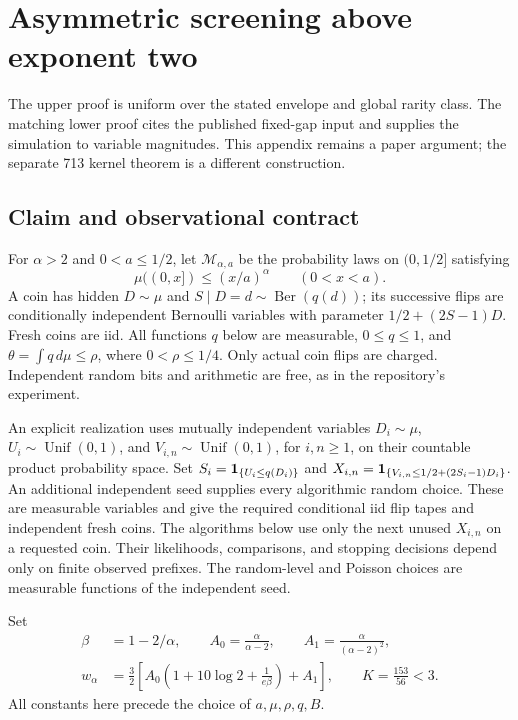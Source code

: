 \section{Asymmetric screening above exponent two}\label{app:above-two}
The upper proof is uniform over the stated envelope and global rarity
class. The matching lower proof cites the published fixed-gap input
and supplies the simulation to variable magnitudes. This appendix
remains a paper argument; the separate 713 kernel theorem is a
different construction.

\subsection{Claim and observational contract}
For $\alpha>2$ and $0<a\le 1/2$, let $\mathcal M_{\alpha,a}$ be the probability
laws on $(0,1/2]$ satisfying
\[
 \mu((0,x])\le (x/a)^\alpha\qquad (0<x<a).
\]
A coin has hidden $D\sim\mu$ and $S\mid D=d\sim\operatorname{Ber}(q(d))$;
its successive flips are conditionally independent Bernoulli variables with
parameter $1/2+(2S-1)D$. Fresh coins are iid. All functions $q$ below are measurable,
$0\le q\le1$, and $\theta=\int q\,d\mu\le\rho$, where $0<\rho\le1/4$.
Only actual coin flips are charged. Independent random bits and arithmetic are
free, as in the repository's experiment.

An explicit realization uses mutually independent variables $D_i\sim\mu$,
$U_i\sim\operatorname{Unif}(0,1)$, and $V_{i,n}\sim\operatorname{Unif}(0,1)$,
for $i,n\ge1$, on their countable product probability space. Set
$S_i=\mathbf 1_{\{U_i\le q(D_i)\}}$ and
$X_{i,n}=\mathbf 1_{\{V_{i,n}\le1/2+(2S_i-1)D_i\}}$.
An additional independent seed supplies every algorithmic random choice.
These are measurable variables and give the required conditional iid flip
tapes and independent fresh coins. The algorithms below use only the next
unused $X_{i,n}$ on a requested coin. Their likelihoods, comparisons, and
stopping decisions depend only on finite observed prefixes. The random-level
and Poisson choices are measurable functions of the independent seed.

Set
\[
\begin{aligned}
 \beta&=1-2/\alpha,\qquad A_0=\frac{\alpha}{\alpha-2},\qquad
 A_1=\frac{\alpha}{(\alpha-2)^2},\\
 w_\alpha&=\frac32\left[
 A_0\left(1+10\log2+\frac1{e\beta}\right)+A_1\right],
 \qquad K=\frac{153}{56}<3.
\end{aligned}
\]
All constants here precede the choice of $a,\mu,\rho,q,B$.

